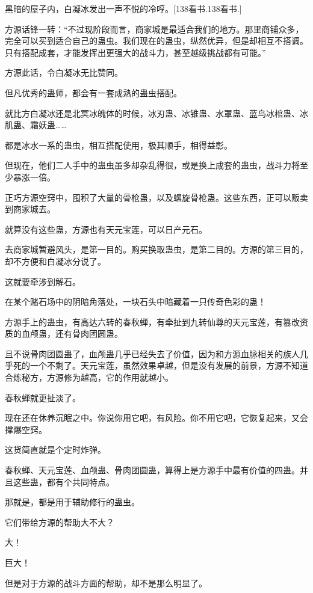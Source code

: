 
\begin{this_body}

黑暗的屋子内，白凝冰发出一声不悦的冷哼。[138看书.138看书.]

方源话锋一转：“不过现阶段而言，商家城是最适合我们的地方。那里商铺众多，完全可以买到适合自己的蛊虫。我们现在的蛊虫，纵然优异，但是却相互不搭调。只有搭配成套，才能发挥出更强大的战斗力，甚至越级挑战都有可能。”

方源此话，令白凝冰无比赞同。

但凡优秀的蛊师，都会有一套成熟的蛊虫搭配。

就比方白凝冰还是北冥冰魄体的时候，冰刃蛊、冰锥蛊、水罩蛊、蓝鸟冰棺蛊、冰肌蛊、霜妖蛊……

都是冰水一系的蛊虫，相互搭配使用，极其顺手，相得益彰。

但现在，他们二人手中的蛊虫虽多却杂乱得很，或是换上成套的蛊虫，战斗力将至少暴涨一倍。

正巧方源空窍中，囤积了大量的骨枪蛊，以及螺旋骨枪蛊。这些东西，正可以贩卖到商家城去。

就算没有这些蛊，方源也有天元宝莲，可以日产元石。

去商家城暂避风头，是第一目的。购买换取蛊虫，是第二目的。方源的第三目的，却不方便和白凝冰分说了。

这就要牵涉到解石。

在某个赌石场中的阴暗角落处，一块石头中暗藏着一只传奇色彩的蛊！

方源手上的蛊虫，有高达六转的春秋蝉，有牵扯到九转仙尊的天元宝莲，有篡改资质的血颅蛊，还有骨肉团圆蛊。

且不说骨肉团圆蛊了，血颅蛊几乎已经失去了价值，因为和方源血脉相关的族人几乎死的一个不剩了。天元宝莲，虽然效果卓越，但是没有发展的前景，方源不知道合炼秘方，方源修为越高，它的作用就越小。

春秋蝉就更扯淡了。

现在还在休养沉眠之中。你说你用它吧，有风险。你不用它吧，它恢复起来，又会撑爆空窍。

这货简直就是个定时炸弹。

春秋蝉、天元宝莲、血颅蛊、骨肉团圆蛊，算得上是方源手中最有价值的四蛊。并且这些蛊，都有个共同特点。

那就是，都是用于辅助修行的蛊虫。

它们带给方源的帮助大不大？

大！

巨大！

但是对于方源的战斗方面的帮助，却不是那么明显了。


\end{this_body}
